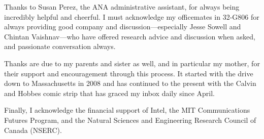 Thanks to Susan Perez, the ANA administrative assistant, for always being
incredibly helpful and cheerful. I must acknowledge my officemates in 32-G806
for always providing good company and discussion---especially Jesse Sowell and
Chintan Vaishnav---who have offered research advice and discussion when
asked, and passionate conversation always.

Thanks are due to my parents and sister as well, and in particular my mother,
for their support and encouragement through this process. It started with the
drive down to Massachusetts in 2008 and has continued to the present with
the Calvin and Hobbes comic strip that has graced my inbox daily since April.

Finally, I acknowledge the financial support of Intel, the MIT Communications
Futures Program, and the Natural Sciences and Engineering Research Council of
Canada (NSERC).
